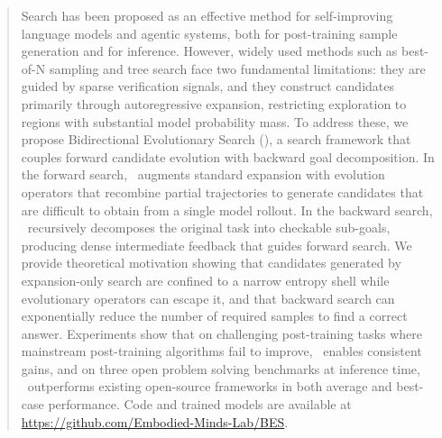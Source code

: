 \begin{abstract}
  Search has been proposed as an effective method for self-improving language models and agentic systems, both for post-training sample generation and for inference. However, widely used methods such as best-of-N sampling and tree search face two fundamental limitations: they are guided by sparse verification signals, and they construct candidates primarily through autoregressive expansion, restricting exploration to regions with substantial model probability mass. To address these, we propose Bidirectional Evolutionary Search (\ours), a search framework that couples forward candidate evolution with backward goal decomposition. In the forward search, \ours\ augments standard expansion with evolution operators that recombine partial trajectories to generate candidates that are difficult to obtain from a single model rollout. In the backward search, \ours\ recursively decomposes the original task into checkable sub-goals, producing dense intermediate feedback that guides forward search. We provide theoretical motivation showing that candidates generated by expansion-only search are confined to a narrow entropy shell while evolutionary operators can escape it, and that backward search can exponentially reduce the number of required samples to find a correct answer. Experiments show that on challenging post-training tasks where mainstream post-training algorithms fail to improve, \ours\ enables consistent gains, and on three open problem solving benchmarks at inference time, \ours\ outperforms existing open-source frameworks in both average and best-case performance. Code and trained models are available at \url{https://github.com/Embodied-Minds-Lab/BES}.
\end{abstract}